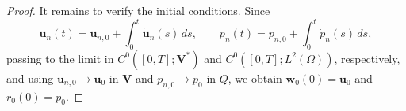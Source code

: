\documentclass{amsart}
\newcommand{\algn}[1]{\begin{align} #1 \end{align}}
\newcommand{\LRp}[1]{\left( #1 \right)}
\begin{document}
\begin{proof}
It remains to verify the initial conditions. Since
\[
\boldsymbol u_n(t)=\boldsymbol u_{n,0}
+\int_0^t \dot{\boldsymbol u}_n(s)\,ds,
\qquad
p_n(t)=p_{n,0}+\int_0^t \dot p_n(s)\,ds,
\]
passing to the limit in \(C^0([0,T];\boldsymbol V^*)\) and
\(C^0([0,T];L^2(\Omega))\), respectively, and using
\(\boldsymbol u_{n,0}\to \boldsymbol u_0\) in \(\boldsymbol V\) and
\(p_{n,0}\to p_0\) in \(Q\), we obtain
\(\boldsymbol w_0(0)=\boldsymbol u_0\) and \(r_0(0)=p_0\).
%
\end{proof}
\end{document}
